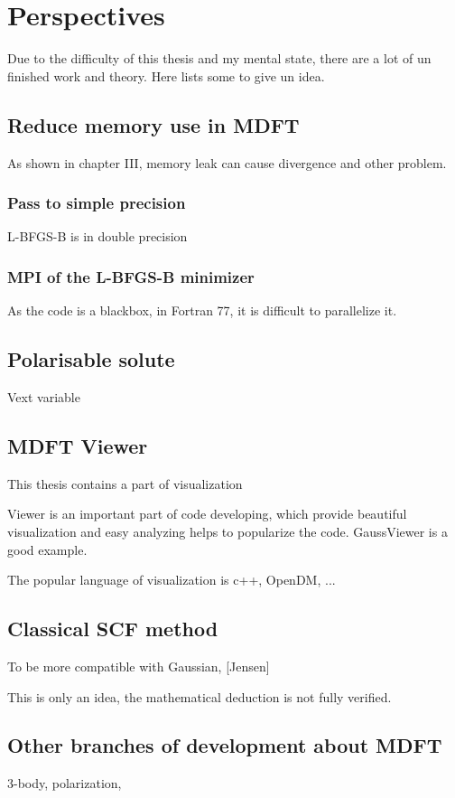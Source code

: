 
\chapter{Perspectives\label{chpt:perspectives}}

Due to the difficulty of this thesis and my mental state, there are
a lot of un finished work and theory. Here lists some to give un idea.

\section{Reduce memory use in MDFT}

As shown in chapter III, memory leak can cause divergence and other
problem.

\subsection{Pass to simple precision}

L-BFGS-B is in double precision

\subsection{MPI of the L-BFGS-B minimizer}

As the code is a blackbox, in Fortran 77, it is difficult to parallelize
it. 

\section{Polarisable solute}

Vext variable

\section{MDFT Viewer}

This thesis contains a part of visualization

Viewer is an important part of code developing, which provide beautiful
visualization and easy analyzing helps to popularize the code. GaussViewer
is a good example.

The popular language of visualization is c++, OpenDM, ...

\section{Classical SCF method}

To be more compatible with Gaussian, {[}Jensen{]}

This is only an idea, the mathematical deduction is not fully verified.

\section{Other branches of development about MDFT}

3-body, polarization, 
